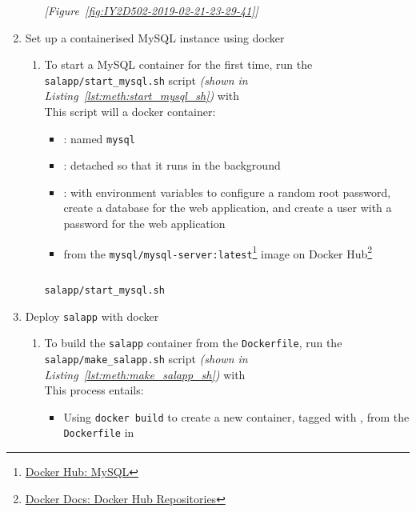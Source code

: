 \begin{enumerate}[leftmargin=0em,label=\protect\listlabelcircle{\arabic*}]
\begin{enumerate}[label=\Roman*~\textcolor{light-gray}{|}]
      \textcolor{deep-gray}{\textit{[Figure~\ref{fig:IY2D502-2019-02-21-23-29-41}]}}
    \end{enumerate}
  \item Set up a containerised MySQL instance using docker
    \begin{enumerate}[label=\Roman*~\textcolor{light-gray}{|}]
      \item To start a MySQL container for the first time, run the \texttt{salapp/start\_mysql.sh} script \textit{(shown in Listing~\ref{lst:meth:start_mysql_sh})} with \\
        This script will  a docker container:
        \begin{itemize}
          \item {}: named \texttt{mysql}
          \item {}: detached so that it runs in the background
          \item {}: with environment variables to configure a random root password, create a database for the web application, and create a user with a password for the web application
          \item from the \texttt{mysql/mysql-server:latest}\footnote{\href{https://hub.docker.com/\_/mysql}{Docker Hub: MySQL}} image on Docker Hub\footnote{\href{https://docs.docker.com/docker-hub/repos/}{Docker Docs: Docker Hub Repositories}}
        \end{itemize}
        \begin{listing}[H]
          \captionsetup{skip=\skiplistingcaptionlen}
          \inputminted[breakanywhere]{bash}{../uswacs-2-iy2d502-salapp/start_mysql.sh}
          \caption{\texttt{salapp/start\_mysql.sh}}
          \label{lst:meth:start_mysql_sh}
        \end{listing}
    \end{enumerate}
  \pagebreak
  \item Deploy \texttt{salapp} with docker
    \begin{enumerate}[label=\Roman*~\textcolor{light-gray}{|}]
      \item To build the \texttt{salapp} container from the \texttt{Dockerfile}, run the \texttt{salapp/make\_salapp.sh} script \textit{(shown in Listing~\ref{lst:meth:make_salapp_sh})} with \\
        This process entails:
        \begin{itemize}
          \item Using \texttt{docker build} to create a new container, tagged with , from the \texttt{Dockerfile} in 

\end{itemize}
\end{enumerate}
\end{enumerate}
